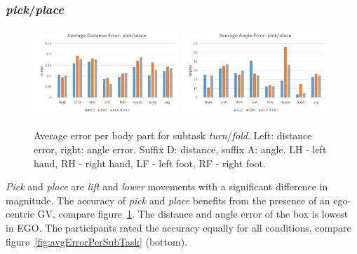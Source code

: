 \subsubsection{\textit{pick}/\textit{place}}
\begin{figure}[H]
	\centering
	\includegraphics[width=0.49\textwidth]{figures/distanceErrorPickPlace.png}
	\includegraphics[width=0.49\textwidth]{figures/angleErrorPickPlace.png}
	\caption[Average error per body part for subtask \textit{turn}/\textit{fold}.]{Average error per body part for subtask \textit{turn}/\textit{fold}. Left: distance error, right: angle error. Suffix D: distance, suffix A: angle. LH - left hand, RH - right hand, LF - left foot, RF - right foot.}
	\label{fig:errorPickPlace}
\end{figure}
\textit{Pick} and \textit{place} are \textit{lift} and \textit{lower} movements with a significant difference in magnitude. The accuracy of \textit{pick} and \textit{place} benefits from the presence of an ego-centric GV, compare figure~\ref{fig:errorPickPlace}. The distance and angle error of the box is lowest in EGO. The participants rated the accuracy equally for all conditions, compare figure~\ref{fig:avgErrorPerSubTask} (bottom).

